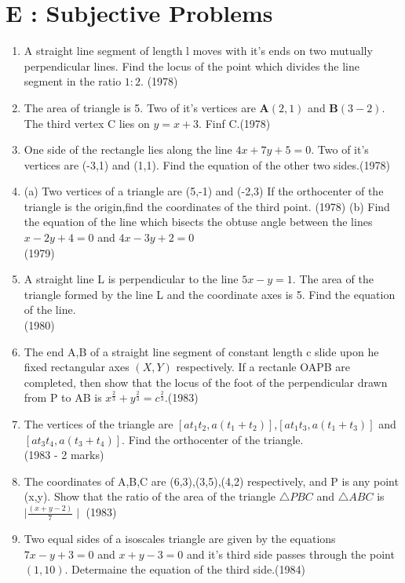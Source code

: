 \documentclass[12pt]{article}
\let\vec\mathbf
\begin{document}
\section*{E  :  Subjective Problems}

\begin{enumerate}
\item  A straight line segment of length l moves with it's ends on two mutually perpendicular lines. Find the locus of the point which divides the line segment in the ratio $1:2$. (1978)
\item The area of triangle is 5. Two of it's vertices are $\vec{A}(2,1)$ and $\vec{B}(3-2)$. The third vertex C lies on $y=x+3$. Finf C.(1978)
\item One side of the rectangle lies along the line $4x+7y+5=0$. Two of it's vertices are (-3,1) and (1,1). Find the equation of the other two sides.(1978)
\item(a) Two vertices of a triangle are (5,-1) and (-2,3) If the orthocenter of the triangle is the origin,find the coordinates of the third point. (1978)
(b) Find the equation of the line which bisects the obtuse angle between the lines $x-2y+4=0$ and $4x-3y+2=0$\\ (1979)
\item  A straight line L is perpendicular to the line $5x-y=1$. The area of the triangle formed by the line L and the coordinate axes is 5. Find the equation of the line.\\ (1980)
\item The end A,B of a straight line segment of constant length c slide upon he fixed rectangular axes $(X,Y)$ respectively. If a rectanle OAPB are completed, then show that the locus of the foot of the perpendicular drawn from P to AB is $x^\frac{2}{3}+y^\frac{2}{3}=c^\frac{2}{3}$.(1983)\\
\item The vertices of the triangle are $[at_1t_2,a(t_1+t_2)]$,$[at_1t_3,a(t_1+t_3)]$ and $[at_3t_4,a(t_3+t_4)]$. Find the orthocenter of the triangle.\\ (1983 - 2 marks)
\item The coordinates of A,B,C are  (6,3),(3,5),(4,2) respectively, and P is any point (x,y). Show that the ratio of the area of the triangle $\triangle PBC$ and $\triangle ABC $ is $\mid\frac{(x+y-2)}{7}\mid$ (1983)\\
\item Two equal sides of a isoscales triangle are given by the equations $7x-y+3=0$ and $x+y-3=0$ and it's third side passes through the point $(1,10)$. Determaine the equation of the third side.(1984)\\

\end{enumerate}
\end{document}
